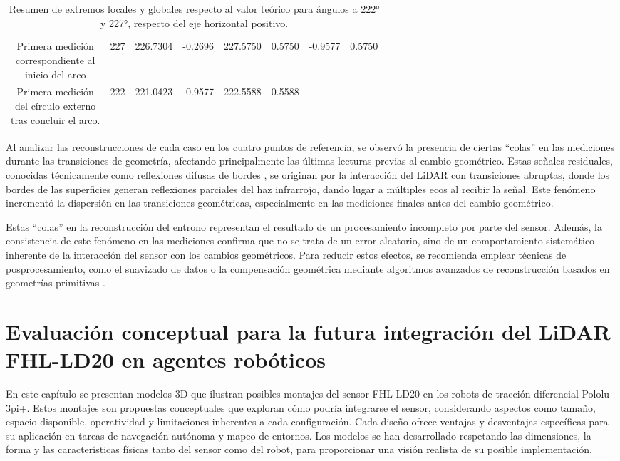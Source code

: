 \begin{table}[H]
{\begin{tabular}{|c|c|c|c|c|c|c|c|}
			\makecell{Primera medición\\ correspondiente al \\inicio del arco}  & 227 & 226.7304 & -0.2696 & 227.5750 & 0.5750 & \multirow{2}{*}{-0.9577} & \multirow{2}{*}{0.5750} \\ \cline{1-6}
			\makecell{Primera medición\\del círculo externo\\ tras concluir el arco.} & 222 & 221.0423 & -0.9577 & 222.5588 & 0.5588 & & \\ \hline
		\end{tabular}%
	}
	\caption{Resumen de extremos locales y globales respecto al valor teórico para ángulos a 222° y 227°, respecto del eje horizontal positivo.}
	\label{cuadro:dispersion_global_2}
\end{table}

Al analizar las reconstrucciones de cada caso en los cuatro puntos de referencia, se observó la presencia de ciertas ``colas'' en las mediciones durante las transiciones de geometría, afectando principalmente las últimas lecturas previas al cambio geométrico. Estas señales residuales, conocidas técnicamente como reflexiones difusas de bordes \cite{diffuse}, se originan por la interacción del LiDAR con transiciones abruptas, donde los bordes de las superficies generan reflexiones parciales del haz infrarrojo, dando lugar a múltiples ecos al recibir la señal. Este fenómeno incrementó la dispersión en las transiciones geométricas, especialmente en las mediciones finales antes del cambio geométrico. 

Estas ``colas'' en la reconstrucción del entrono representan el resultado de un procesamiento incompleto por parte del sensor. Además, la consistencia de este fenómeno en las mediciones confirma que no se trata de un error aleatorio, sino de un comportamiento sistemático inherente de la interacción del sensor con los cambios geométricos. Para reducir estos efectos, se recomienda emplear técnicas de posprocesamiento, como el suavizado de datos o la compensación geométrica mediante algoritmos avanzados de reconstrucción basados en geometrías primitivas \cite{primitive}.

\chapter{Evaluación conceptual para la futura integración del LiDAR FHL-LD20 en agentes robóticos}
En este capítulo se presentan modelos 3D que ilustran posibles montajes del sensor FHL-LD20 en los robots de tracción diferencial Pololu 3pi+. Estos montajes son propuestas conceptuales que exploran cómo podría integrarse el sensor, considerando aspectos como tamaño, espacio disponible, operatividad y limitaciones inherentes a cada configuración. Cada diseño ofrece ventajas y desventajas específicas para su aplicación en tareas de navegación autónoma y mapeo de entornos. Los modelos se han desarrollado respetando las dimensiones, la forma y las características físicas tanto del sensor como del robot, para proporcionar una visión realista de su posible implementación.

